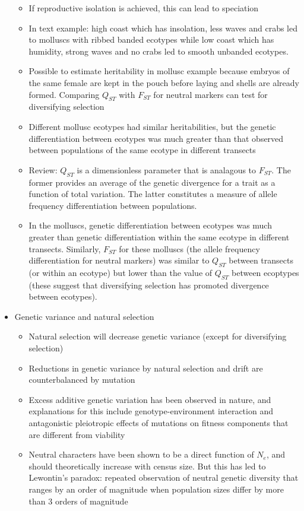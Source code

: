 \documentclass[12pt]{amsart}
\begin{document}
\begin{itemize}
\begin{itemize}
\item If reproductive isolation is achieved, this can lead to speciation
\item In text example: high coast which has insolation, less waves and crabs led to molluscs with ribbed banded ecotypes while low coast which has humidity, strong waves and no crabs led to smooth unbanded ecotypes.  
\item Possible to estimate heritability in mollusc example because embryos of the same female are kept in the pouch before laying and shells are already formed. Comparing $Q_{ST}$ with $F_{ST}$ for neutral markers can test for diversifying selection
\item Different mollusc ecotypes had similar heritabilities, but the genetic differentiation between ecotypes was much greater than that observed between populations of the same ecotype in different transects 
\item Review: $Q_{ST}$ is a dimensionless parameter that is analagous to $F_{ST}$. The former provides an average of the genetic divergence for a trait as a function of total variation. The latter constitutes a measure of allele frequency differentiation between populations.
\item In the molluscs, genetic differentiation between ecotypes was much greater than genetic differentiation within the same ecotype in different transects. Similarly, $F_{ST}$ for these molluscs (the allele frequency differentiation for neutral markers) was similar to $Q_{ST}$ between transects (or within an ecotype) but lower than the value of $Q_{ST}$ between ecoptypes (these suggest that diversifying selection has promoted divergence between ecotypes).
\end{itemize}
\item Genetic variance and natural selection
\begin{itemize}
\item Natural selection will decrease genetic variance (except for diversifying selection)
\item Reductions in genetic variance by natural selection and drift are counterbalanced by mutation
\item Excess additive genetic variation has been observed in nature, and explanations for this include genotype-environment interaction and antagonistic pleiotropic effects of mutations on fitness components that are different from viability
\item Neutral characters have been shown to be a direct function of $N_e$, and should theoretically increase with census size. But this has led to Lewontin's paradox: repeated observation of neutral genetic diversity that ranges by an order of magnitude when population sizes differ by more than 3 orders of magnitude

\end{itemize}
\end{itemize}
\end{document}

